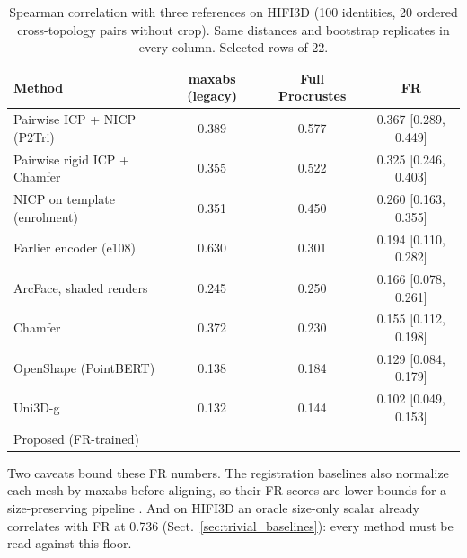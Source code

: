 \begin{table}[!ht]
\centering
\small
\caption{Spearman correlation with three references on HIFI3D (100
identities, 20 ordered cross-topology pairs without crop). Same distances
and bootstrap replicates in every column. Selected rows of 22.}
\label{tab:gt_reeval}
\begin{tabular}{lccc}
\toprule
Method & maxabs (legacy) & Full Procrustes & FR \\
\midrule
Pairwise ICP + NICP (P2Tri)  & 0.389 & 0.577 & 0.367 [0.289, 0.449] \\
Pairwise rigid ICP + Chamfer & 0.355 & 0.522 & 0.325 [0.246, 0.403] \\
NICP on template (enrolment) & 0.351 & 0.450 & 0.260 [0.163, 0.355] \\
Earlier encoder (e108)       & 0.630 & 0.301 & 0.194 [0.110, 0.282] \\
ArcFace, shaded renders      & 0.245 & 0.250 & 0.166 [0.078, 0.261] \\
Chamfer                      & 0.372 & 0.230 & 0.155 [0.112, 0.198] \\
OpenShape (PointBERT)        & 0.138 & 0.184 & 0.129 [0.084, 0.179] \\
Uni3D-g                      & 0.132 & 0.144 & 0.102 [0.049, 0.153] \\
\midrule
Proposed (FR-trained)        & \todo{} & \todo{} & \todo{} \\
\bottomrule
\end{tabular}
\end{table}

\noindent
Two caveats bound these FR numbers. The registration baselines also normalize
each mesh by maxabs before aligning, so their FR scores are lower bounds for
a size-preserving pipeline .
And on HIFI3D an oracle size-only scalar already correlates with FR at 0.736
(Sect.~\ref{sec:trivial_baselines}): every method must be read against this
floor.
